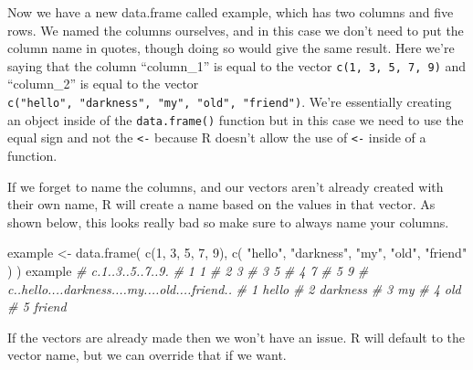 \documentclass[
  a4paper,
]{krantz}
\makeatletter
\newenvironment{Shaded}{\begin{snugshade}}{\end{snugshade}}
\newcommand{\CommentTok}[1]{\textcolor[rgb]{0.37,0.37,0.37}{\textit{#1}}}
\newcommand{\DecValTok}[1]{\textcolor[rgb]{0.06,0.06,0.06}{#1}}
\newcommand{\FunctionTok}[1]{\textcolor[rgb]{0,0,0}{#1}}
\newcommand{\NormalTok}[1]{#1}
\newcommand{\OtherTok}[1]{\textcolor[rgb]{0.37,0.37,0.37}{#1}}
\newcommand{\StringTok}[1]{\textcolor[rgb]{0.5,0.5,0.5}{#1}}
\newenvironment{kframe}{%
\medskip{}
\setlength{\fboxsep}{.8em}
 \def\at@end@of@kframe{}%
 \ifinner\ifhmode%
  \def\at@end@of@kframe{\end{minipage}}%
  \begin{minipage}{\columnwidth}%
 \fi\fi%
 \def\FrameCommand##1{\hskip\@totalleftmargin \hskip-\fboxsep
 \colorbox{shadecolor}{##1}\hskip-\fboxsep
     \hskip-\linewidth \hskip-\@totalleftmargin \hskip\columnwidth}%
 \MakeFramed {\advance\hsize-\width
   \@totalleftmargin\z@ \linewidth\hsize
   \@setminipage}}%
 {\par\unskip\endMakeFramed%
 \at@end@of@kframe}
\renewenvironment{Shaded}{\begin{kframe}}{\end{kframe}}
\makeatother
\begin{document}
Now we have a new data.frame called example, which has two
columns and five rows. We named the columns ourselves, and
in this case we don't need to put the column name in quotes,
though doing so would give the same result. Here we're
saying that the column ``column\_1'' is equal to the vector
\texttt{c(1,\ 3,\ 5,\ 7,\ 9)} and ``column\_2'' is equal to
the vector
\texttt{c("hello",\ "darkness",\ "my",\ "old",\ "friend")}.
We're essentially creating an object inside of the
\texttt{data.frame()} function but in this case we need to
use the equal sign and not the \texttt{\textless{}-} because
R doesn't allow the use of \texttt{\textless{}-} inside of a
function.

If we forget to name the columns, and our vectors aren't
already created with their own name, R will create a name
based on the values in that vector. As shown below, this
looks really bad so make sure to always name your columns.

\begin{Shaded}
\begin{Highlighting}[]
\NormalTok{example }\OtherTok{\textless{}{-}} \FunctionTok{data.frame}\NormalTok{(}
  \FunctionTok{c}\NormalTok{(}\DecValTok{1}\NormalTok{, }\DecValTok{3}\NormalTok{, }\DecValTok{5}\NormalTok{, }\DecValTok{7}\NormalTok{, }\DecValTok{9}\NormalTok{),}
  \FunctionTok{c}\NormalTok{(}
    \StringTok{"hello"}\NormalTok{,}
    \StringTok{"darkness"}\NormalTok{,}
    \StringTok{"my"}\NormalTok{,}
    \StringTok{"old"}\NormalTok{,}
    \StringTok{"friend"}
\NormalTok{  )}
\NormalTok{)}
\NormalTok{example}
\CommentTok{\#   c.1..3..5..7..9.}
\CommentTok{\# 1                1}
\CommentTok{\# 2                3}
\CommentTok{\# 3                5}
\CommentTok{\# 4                7}
\CommentTok{\# 5                9}
\CommentTok{\#   c..hello....darkness....my....old....friend..}
\CommentTok{\# 1                                         hello}
\CommentTok{\# 2                                      darkness}
\CommentTok{\# 3                                            my}
\CommentTok{\# 4                                           old}
\CommentTok{\# 5                                        friend}
\end{Highlighting}
\end{Shaded}

If the vectors are already made then we won't have an issue.
R will default to the vector name, but we can override that
if we want.
\end{document}
